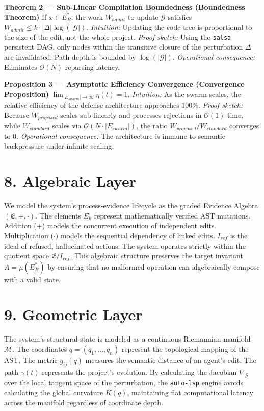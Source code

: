 \textbf{Theorem 2 — Sub-Linear Compilation Boundedness (Boundedness Theorem)}
If $x \in E_B^*$, the work $W_{admit}$ to update $\mathcal{G}$ satisfies $W_{admit} \leq k \cdot |\Delta| \log(|\mathcal{G}|)$.
\textit{Intuition:} Updating the code tree is proportional to the size of the edit, not the whole project.
\textit{Proof sketch:} Using the \texttt{salsa} persistent DAG, only nodes within the transitive closure of the perturbation $\Delta$ are invalidated. Path depth is bounded by $\log(|\mathcal{G}|)$.
\textit{Operational consequence:} Eliminates $\mathcal{O}(N)$ reparsing latency.

\textbf{Proposition 3 — Asymptotic Efficiency Convergence (Convergence Proposition)}
$\lim_{|E_{swarm}| \to \infty} \eta(t) = 1$.
\textit{Intuition:} As the swarm scales, the relative efficiency of the defense architecture approaches $100\%$.
\textit{Proof sketch:} Because $W_{proposed}$ scales sub-linearly and processes rejections in $\mathcal{O}(1)$ time, while $W_{standard}$ scales via $\mathcal{O}(N \cdot |E_{swarm}|)$, the ratio $W_{proposed} / W_{standard}$ converges to $0$.
\textit{Operational consequence:} The architecture is immune to semantic backpressure under infinite scaling.

\section{8. Algebraic Layer}
We model the system's process-evidence lifecycle as the graded Evidence Algebra $(\mathfrak{E}, +, \cdot)$. The elements $E_k$ represent mathematically verified AST mutations. Addition ($+$) models the concurrent execution of independent edits. Multiplication ($\cdot$) models the sequential dependency of linked edits. $I_{ref}$ is the ideal of refused, hallucinated actions. The system operates strictly within the quotient space $\mathfrak{E} / I_{ref}$. This algebraic structure preserves the target invariant $A = \mu(E_B^*)$ by ensuring that no malformed operation can algebraically compose with a valid state.

\section{9. Geometric Layer}
The system's structural state is modeled as a continuous Riemannian manifold $\mathcal{M}$. The coordinates $q = (q_1, \dots, q_n)$ represent the topological mapping of the AST. The metric $g_{ij}(q)$ measures the semantic distance of an agent's edit. The path $\gamma(t)$ represents the project's evolution. By calculating the Jacobian $\nabla_{\mathcal{G}}$ over the local tangent space of the perturbation, the \texttt{auto-lsp} engine avoids calculating the global curvature $K(q)$, maintaining flat computational latency across the manifold regardless of coordinate depth.

